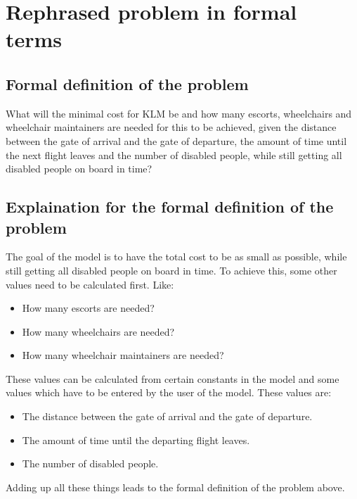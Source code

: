 \documentclass[a4paper, 12pt, notitlepage]{report}
\begin{document}
\section{Rephrased problem in formal terms}

	\subsection{Formal definition of the problem}
	What will the minimal cost for KLM be and how many escorts, wheelchairs and wheelchair maintainers are needed for this to be achieved, given the distance between the gate of arrival and the gate of departure, the amount of time until the next flight leaves and the number of disabled people, while still getting all disabled people on board in time?
	
	\subsection{Explaination for the formal definition of the problem}
	The goal of the model is to have the total cost to be as small as possible, while still getting all disabled people on board in time. To achieve this, some other values need to be calculated first. Like:
\begin{itemize}
  \item How many escorts are needed?
  \item How many wheelchairs are needed?
  \item How many wheelchair maintainers are needed?
\end{itemize}
These values can be calculated from certain constants in the model and some values which have to be entered by the user of the model. These values are:
\begin{itemize}
  \item The distance between the gate of arrival and the gate of departure.
  \item The amount of time until the departing flight leaves.
  \item The number of disabled people.
\end{itemize}
Adding up all these things leads to the formal definition of the problem above.

\end{document}
